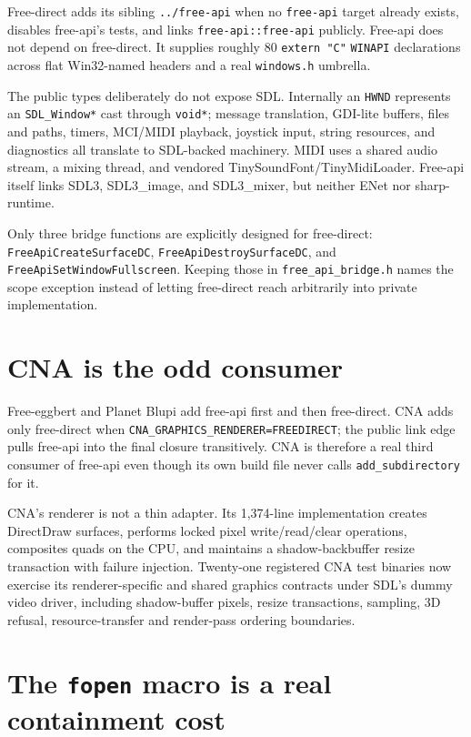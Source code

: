 Free-direct adds its sibling \texttt{../free-api} when no \texttt{free-api} target already
exists, disables free-api's tests, and links \texttt{free-api::free-api} publicly. Free-api
does not depend on free-direct. It supplies roughly 80 \texttt{extern "C"} \texttt{WINAPI}
declarations across flat Win32-named headers and a real \texttt{windows.h} umbrella.

The public types deliberately do not expose SDL. Internally an \texttt{HWND} represents an
\texttt{SDL\_Window*} cast through \texttt{void*}; message translation, GDI-lite buffers,
files and paths, timers, MCI/MIDI playback, joystick input, string resources, and diagnostics
all translate to SDL-backed machinery. MIDI uses a shared audio stream, a mixing thread, and
vendored TinySoundFont/TinyMidiLoader. Free-api itself links SDL3, SDL3\_image, and SDL3\_mixer,
but neither ENet nor sharp-runtime.

Only three bridge functions are explicitly designed for free-direct:
\texttt{FreeApiCreateSurfaceDC}, \texttt{FreeApiDestroySurfaceDC}, and
\texttt{FreeApiSetWindowFullscreen}. Keeping those in \texttt{free\_api\_bridge.h} names the
scope exception instead of letting free-direct reach arbitrarily into private implementation.

\section{CNA is the odd consumer}

Free-eggbert and Planet Blupi add free-api first and then free-direct. CNA adds only free-direct
when \texttt{CNA\_GRAPHICS\_RENDERER=FREEDIRECT}; the public link edge pulls free-api into the
final closure transitively. CNA is therefore a real third consumer of free-api even though its
own build file never calls \texttt{add\_subdirectory} for it.

CNA's renderer is not a thin adapter. Its 1{,}374-line implementation creates DirectDraw
surfaces, performs locked pixel write/read/clear operations, composites quads on the CPU, and
maintains a shadow-backbuffer resize transaction with failure injection. Twenty-one registered
CNA test binaries now exercise its renderer-specific and shared graphics contracts under SDL's
dummy video driver, including shadow-buffer pixels, resize transactions, sampling, 3D refusal,
resource-transfer and render-pass ordering boundaries.

\section{The \texttt{fopen} macro is a real containment cost}

